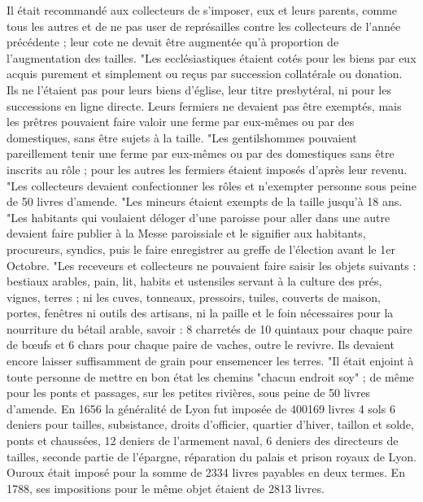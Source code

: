 Il était recommandé aux collecteurs de s'imposer, eux et leurs parents, comme tous les autres et de ne pas user de représailles contre
les collecteurs de l'année précédente ; leur cote ne devait être
augmentée qu'à proportion de l'augmentation des tailles.
    "Les ecclésiastiques étaient cotés pour les biens par eux acquis
purement et simplement ou reçus par succession collatérale ou donation. Ils ne l'étaient pas pour leurs biens d'église, leur titre presbytéral, ni pour les successions en ligne directe. Leurs fermiers ne
devaient pas être exemptés, mais les prêtres pouvaient faire valoir
une ferme par eux-mêmes ou par des domestiques, sans être sujets à
la taille.
    "Les gentilshommes pouvaient pareillement tenir une ferme par
eux-mêmes ou par des domestiques sans être inscrits au rôle ; pour
les autres les fermiers étaient imposés d'après leur revenu.
    "Les collecteurs devaient confectionner les rôles et n'exempter
personne sous peine de 50 livres d'amende.
    "Les mineurs étaient exempts de la taille jusqu'à 18 ans.
    "Les habitants qui voulaient déloger d'une paroisse pour aller
dans une autre devaient faire publier à la Messe paroissiale et le
signifier aux habitants, procureurs, syndics, puis le faire enregistrer
au greffe de l'élection avant le 1er Octobre.
    "Les receveurs et collecteurs ne pouvaient faire saisir les objets suivants : bestiaux arables, pain, lit, habits et ustensiles servant à la culture des prés, vignes, terres ; ni les cuves, tonneaux,
pressoirs, tuiles, couverts de maison, portes, fenêtres ni outils des
artisans, ni la paille et le foin nécessaires pour la nourriture du
bétail arable, savoir : 8 charretés de 10 quintaux pour chaque paire
de bœufs et 6 chars pour chaque paire de vaches, outre le revivre.
Ils devaient encore laisser suffisamment de grain pour ensemencer
les terres.
    "Il était enjoint à toute personne de mettre en bon état les
chemins "chacun endroit soy" ; de même pour les ponts et passages,
sur les petites rivières, sous peine de 50 livres d'amende.
    En 1656 la généralité de Lyon fut imposée de 400169 livres 4 sols
6 deniers pour tailles, subsistance, droits d'officier, quartier d'hiver, taillon et solde, ponts et chaussées, 12 deniers de l'armement naval, 6 deniers des directeurs de tailles, seconde partie de l'épargne, réparation du palais et prison royaux de Lyon. Ouroux était imposé
pour la somme de 2334 livres payables en deux termes. En 1788, ses impositions pour le même objet étaient de 2813 livres.

